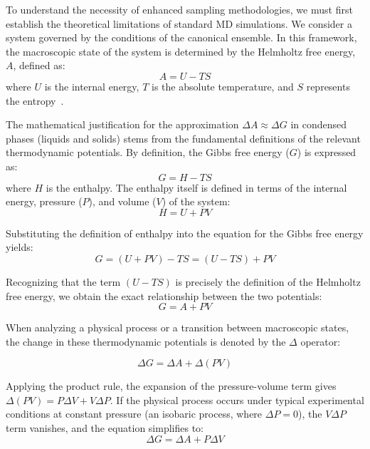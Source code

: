 To understand the necessity of enhanced sampling methodologies, we must first establish the theoretical limitations of standard MD simulations. We consider a system governed by the conditions of the canonical ensemble. In this framework, the macroscopic state of the system is determined by the Helmholtz free energy, $A$, defined as:
\begin{equation}
    A = U - TS
\end{equation}
where $U$ is the internal energy, $T$ is the absolute temperature, and $S$ represents the entropy~\cite{termo_1,termo_2}. 

The mathematical justification for the approximation $\Delta A \approx \Delta G$ in condensed phases (liquids and solids) stems from the fundamental definitions of the relevant thermodynamic potentials. By definition, the Gibbs free energy ($G$) is expressed as:
\begin{equation}
    G = H - TS
\end{equation}
where $H$ is the enthalpy. The enthalpy itself is defined in terms of the internal energy, pressure ($P$), and volume ($V$) of the system:
\begin{equation}
    H = U + PV
\end{equation}

Substituting the definition of enthalpy into the equation for the Gibbs free energy yields:
\begin{equation}
    G = (U + PV) - TS = (U - TS) + PV
\end{equation}

Recognizing that the term $(U - TS)$ is precisely the definition of the Helmholtz free energy, we obtain the exact relationship between the two potentials:
\begin{equation}
    G = A + PV
\end{equation}

When analyzing a physical process or a transition between macroscopic states, the change in these thermodynamic potentials is denoted by the $\Delta$ operator:

\begin{equation}
    \Delta G = \Delta A + \Delta(PV)
\end{equation}

Applying the product rule, the expansion of the pressure-volume term gives $\Delta(PV) = P\Delta V + V\Delta P$. If the physical process occurs under typical experimental conditions at constant pressure (an isobaric process, where $\Delta P = 0$), the $V\Delta P$ term vanishes, and the equation simplifies to:
\begin{equation}
    \Delta G = \Delta A + P\Delta V
\end{equation}

